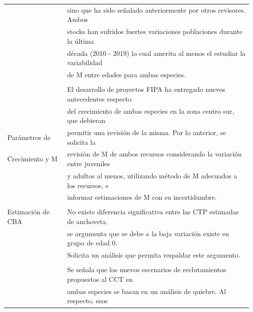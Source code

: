\documentclass[
  spanish,
]{article}
\begin{document}
\begin{table}[h]
{\begin{tabular}{|l|l|}
                          & sino que ha sido señalado anteriormente por otros revisores. Ambos         \\
                          & stocks han sufridos fuertes variaciones poblaciones durante la última      \\
                          & década (2010 - 2019) lo cual amerita al menos el estudiar la variabilidad  \\
                          & de M entre edades para ambas especies.                                      \\ \hline
                          &                                                                            \\
                          & El desarrollo de proyectos FIPA ha entregado nuevos antecedentes respecto  \\
                          & del crecimiento de ambas especies en la zona centro sur, que debieran      \\
   Parámetros de          & permitir una revisión de la misma. Por lo anterior, se solicita la         \\
   Crecimiento  y M       & revisión de M de ambos recursos considerando la variación entre juveniles  \\
                          & y adultos al menos, utilizando método de M adecuados a los recursos, e     \\
                          & informar estimaciones de M con su incertidumbre.                           \\ \hline
                          &                                                                            \\
   Estimación de CBA      & No existe diferencia significativa entre las CTP estimadas de anchoveta,   \\
                          & se argumenta que se debe a la baja variación existe en grupo de edad 0.    \\
                          & Solicita un análisis que permita respaldar este argumento.                 \\ \hline
                          &                                                                            \\
                          & Se señala que los nuevos escenarios de reclutamientos propuestos al CCT en  \\
                          & ambas especies se basan en un análisis de quiebre. Al respecto, esos       \\

\end{tabular}}
\end{table}
\end{document}
